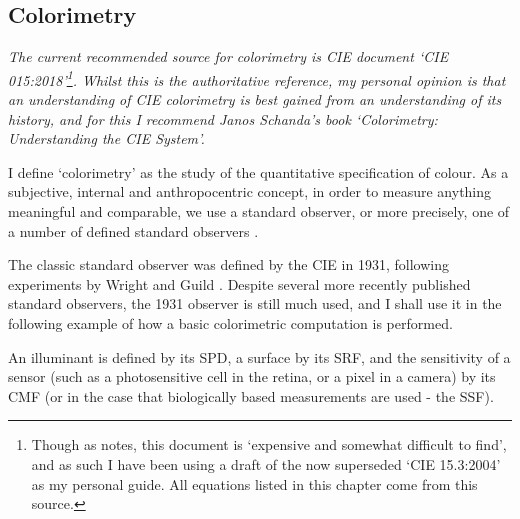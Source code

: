 \subsection{Colorimetry}

\textit{The current recommended source for colorimetry is \gls{CIE} document `\gls{CIE} 015:2018'\citep{cie_cie_2018}\footnote{Though as \citet{fairchild_cie_2019} notes, this document is `expensive and somewhat difficult to find', and as such I have been using a draft of the now superseded `\gls{CIE} 15.3:2004'\citep{cie_cie_2004-2} as my personal guide. All equations listed in this chapter come from this source.}. Whilst this is the authoritative reference, my personal opinion is that an understanding of \gls{CIE} colorimetry is best gained from an understanding of its history, and for this I recommend Janos Schanda's book `Colorimetry: Understanding the \gls{CIE} System'\citep{schanda_colorimetry_2007}.}

\bigskip

I define `colorimetry' as the study of the quantitative specification of colour. As a subjective, internal and anthropocentric concept, in order to measure anything meaningful and comparable, we use a standard observer, or more precisely, one of a number of defined standard observers \cite{cie_bs_2011}.

The classic standard observer was defined by the \gls{CIE} in 1931, following experiments by Wright and Guild \cite{wright_re-determination_1929, guild_colorimetric_1931}. Despite several more recently published standard observers, the 1931 observer is still much used, and I shall use it in the following example of how a basic colorimetric computation is performed.


An illuminant is defined by its \gls{SPD}, a surface by its \gls{SRF}, and the sensitivity of a sensor (such as a photosensitive cell in the retina, or a pixel in a camera) by its \gls{CMF} (or in the case that biologically based measurements are used - the \gls{SSF}).

